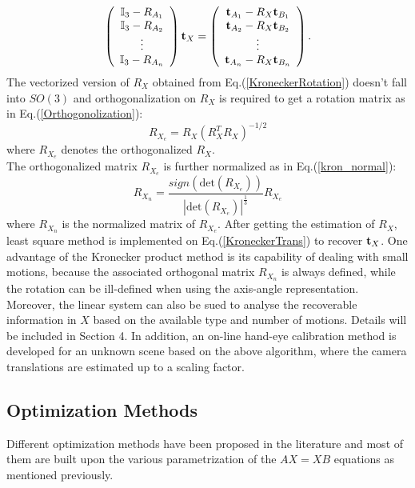 \documentclass[twocolumn,10pt]{asme2ej}
\newcommand{\ttt}{{\bf t}}
\begin{document}
\begin{equation}
\left(
\begin{array}{c}
\mathbb{I}_{3} - R_{A_{1}} \\
\mathbb{I}_{3} - R_{A_{2}} \\
\vdots\\
\mathbb{I}_{3} - R_{A_{n}}
\end{array}
\right) 
{\ttt_{X}}
 = 
\left( 
\begin{array}{c}
{\bf{t}}_{A_{1}} - R_{X}{\bf{t}}_{B_{1}}\\
{\bf{t}}_{A_{2}} - R_{X}{\bf{t}}_{B_{2}}\\
\vdots\\
{\bf{t}}_{A_{n}} - R_{X}{\bf{t}}_{B_{n}}\\
\end{array}
\right).
\label{KroneckerTrans}
\end{equation}
The vectorized version of $R_X$ obtained from Eq.(\ref{KroneckerRotation}) doesn't fall into $SO(3)$ and
orthogonalization on $R_{X}$ is required to get a rotation matrix as in Eq.(\ref{Orthogonolization}):
\begin{equation}
R_{X_{e}} = R_{X}(R_{X}^{T}R_{X})^{-1/2}
\label{Orthogonolization}
\end{equation}
\cite{horn1986robot}
where $R_{X_{e}}$ denotes the orthogonalized $R_{X}$.\\
The orthogonalized matrix $R_{X_{e}}$ is further normalized as in Eq.(\ref{kron_normal}): 
\begin{equation}
R_{X_{n}} = \dfrac{sign(\textrm{det}(R_{X_{e}}))}{{|\textrm{det}(R_{X_{e}})|}^{\tfrac{1}{3}}}R_{X_{e}}
\label{kron_normal}
\end{equation}
where $R_{X_{n}}$ is the normalized matrix of $R_{X_{e}}$.
After getting the estimation of $R_{X}$, least square method is implemented on Eq.(\ref{KroneckerTrans}) to recover $\ttt_{X}$. One advantage of the Kronecker product method is its capability of dealing with small motions, because the associated orthogonal matrix $R_{X_{n}}$ is always defined, while the rotation can be ill-defined when using the axis-angle representation. Moreover, the linear system can also be sued to analyse the  recoverable information in $X$ based on the available type and number of motions. Details will be included in Section 4. In addition, an on-line hand-eye calibration method is developed for an unknown scene based on the above algorithm, where the camera translations are estimated up to a scaling factor. 

\subsection{Optimization Methods}
\label{sec:optimization}
Different optimization methods have been proposed in the literature and most of them are built upon the various parametrization of the $AX=XB$ equations as mentioned previously. 
\end{document}
